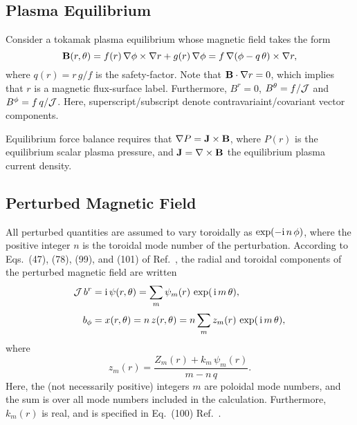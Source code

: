 \documentclass[12pt,prb,aps]{revtex4-1}
\begin{document}
\subsection{Plasma Equilibrium}\label{equilb}
Consider a tokamak plasma equilibrium whose magnetic field takes the form
\begin{equation}
{\bf B}(r,\theta) = f(r)\,\nabla\phi\times \nabla r + g(r)\,\nabla\phi = f\,\nabla(\phi-q\,\theta)\times \nabla r,
\end{equation}
where
$q(r) = r\,g/f$ is the safety-factor. Note that ${\bf B}\cdot\nabla r=0$, which implies that $r$ is a magnetic flux-surface label.
Furthermore,   $B^r=0$, $B^\theta= f/{\cal J}$ and  $B^\phi =f\,q/{\cal J}$. Here, superscript/subscript denote contravariaint/covariant
vector components. 

Equilibrium force balance requires that
$ \nabla P={\bf J}\times {\bf B}$, 
where $P(r)$ is the equilibrium scalar plasma pressure, and ${\bf J}=\nabla\times {\bf B}$ the equilibrium plasma current density. 

\subsection{Perturbed Magnetic Field}
All perturbed quantities are assumed to vary toroidally as $\exp(-{\rm i}\,n\,\phi)$,
where the positive integer  $n$ is the toroidal mode number of the perturbation. 
According to Eqs.~(47), (78), (99), and (101) of Ref.~, the radial and toroidal components of the perturbed magnetic field are written 
\begin{align}\label{a3}
{\cal J}\,b^r &={\rm i}\,\psi(r,\theta)= \sum_m \psi_m(r)\,\exp(\,{\rm i}\,m\,\theta),\\[0.5ex]
b_\phi &= x(r,\theta)= n\,z(r,\theta) = n\sum_m z_m(r) \,\exp(\,{\rm i}\,m\,\theta),
\end{align}
where
\begin{equation}
z_m(r) = \frac{Z_m(r) + k_m\,\psi_m(r)}{m-n\,q}.
\end{equation}
Here, the (not necessarily positive) integers $m$ are poloidal mode numbers, and the sum is over all mode numbers included in the calculation. 
Furthermore, 
$k_m(r)$ is real, and is specified in Eq.~(100) Ref.~. 
\end{document}
